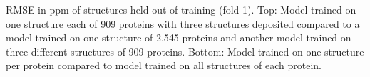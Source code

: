 RMSE in ppm of structures held out of training (fold 1). Top: Model trained on one structure each of 909 proteins with three structures deposited compared to a model trained on one structure of 2,545 proteins and another model trained on three different structures of 909 proteins. Bottom: Model trained on one structure per protein compared to model trained on all structures of each protein.
